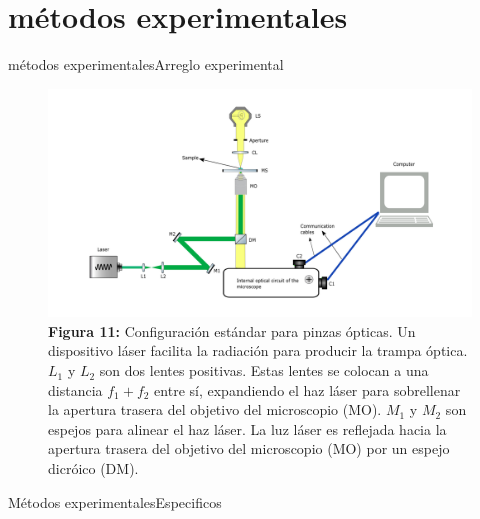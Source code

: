 \documentclass[10pt,aspectratio=1610,compress,dvipsnames]{beamer}
\begin{document}
\section{métodos experimentales}
\begin{frame}{métodos experimentales}{Arreglo experimental}

\begin{figure}
    \centering
    \includegraphics[scale=0.27]{Newplots_microfluidics_results/setup3.png}
    \captionsetup{labelformat = empty}
    \caption{\textbf{Figura 11:} Configuración estándar para pinzas ópticas. Un dispositivo láser facilita la radiación para producir la trampa óptica. $L_1$ y $L_2$ son dos lentes positivas. Estas lentes se colocan a una distancia $f_1 + f_2$ entre sí, expandiendo el haz láser para sobrellenar la apertura trasera del objetivo del microscopio (MO). $M_1$ y $M_2$ son espejos para alinear el haz láser. La luz láser es reflejada hacia la apertura trasera del objetivo del microscopio (MO) por un espejo dicróico (DM).}
    \label{setuptweezers}
\end{figure}

\end{frame}


\begin{frame}{Métodos experimentales}{Especificos}

\end{frame}
\end{document}
